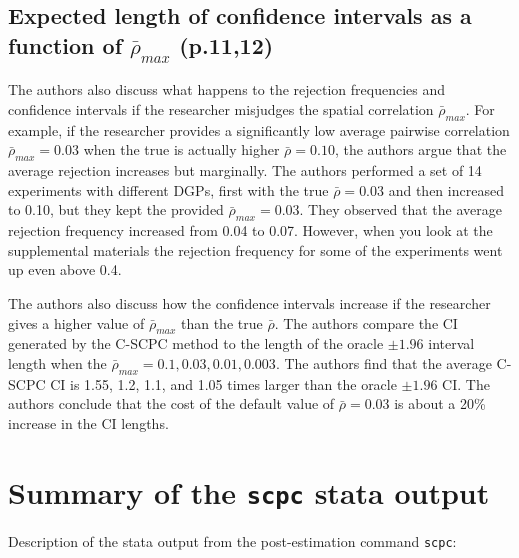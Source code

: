 \documentclass[
]{article}
\begin{document}
\hypertarget{expected-length-of-confidence-intervals-as-a-function-of-barrho_max-p.1112}{%
\subsection{\texorpdfstring{Expected length of confidence intervals as a
function of \(\bar\rho_{max}\)
(p.11,12)}{Expected length of confidence intervals as a function of \textbackslash bar\textbackslash rho\_\{max\} (p.11,12)}}\label{expected-length-of-confidence-intervals-as-a-function-of-barrho_max-p.1112}}

The authors also discuss what happens to the rejection frequencies and
confidence intervals if the researcher misjudges the spatial correlation
\(\bar\rho_{max}\). For example, if the researcher provides a
significantly low average pairwise correlation \(\bar\rho_{max}=0.03\)
when the true is actually higher \(\bar\rho=0.10\), the authors argue
that the average rejection increases but marginally. The authors
performed a set of 14 experiments with different DGPs, first with the
true \(\bar\rho=0.03\) and then increased to 0.10, but they kept the
provided \(\bar\rho_{max}=0.03\). They observed that the average
rejection frequency increased from 0.04 to 0.07. However, when you look
at the supplemental materials the rejection frequency for some of the
experiments went up even above 0.4.

The authors also discuss how the confidence intervals increase if the
researcher gives a higher value of \(\bar\rho_{max}\) than the true
\(\bar\rho\). The authors compare the CI generated by the C-SCPC method
to the length of the oracle \(\pm 1.96\) interval length when the
\(\bar\rho_{max}={0.1, 0.03,0.01,0.003}\). The authors find that the
average C-SCPC CI is 1.55, 1.2, 1.1, and 1.05 times larger than the
oracle \(\pm 1.96\) CI. The authors conclude that the cost of the
default value of \(\bar\rho=0.03\) is about a 20\% increase in the CI
lengths.

\hypertarget{summary-of-the-scpc-stata-output}{%
\section{\texorpdfstring{Summary of the \texttt{scpc} stata
output}{Summary of the scpc stata output}}\label{summary-of-the-scpc-stata-output}}

Description of the stata output from the post-estimation command
\texttt{scpc}:
\end{document}
